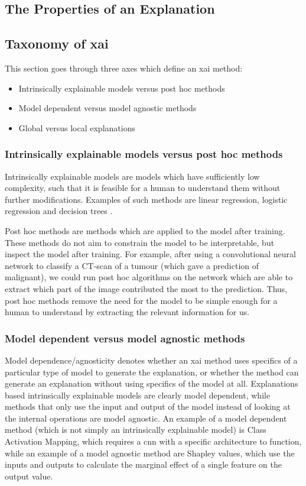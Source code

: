 \documentclass[UKenglish]{uiomasterthesis} %
\theoremstyle{definition}
\begin{document}
\subsection{The Properties of an Explanation}

\subsection{Taxonomy of \ac{xai}}

This section goes through three axes which define an \ac{xai} method:

\begin{itemize}
  \item Intrinsically explainable models versus post hoc methods
  \item Model dependent versus model agnostic methods
  \item Global versus local explanations
\end{itemize}


\subsubsection{Intrinsically explainable models versus post hoc methods}

Intrinsically explainable models are models which have sufficiently low complexity, such that it is feasible for a human to understand them without further modifications. Examples of such methods are linear regression, logistic regression and decision trees \cite{molnar}. 

Post hoc methods are methods which are applied to the model after training. These methods do not aim to constrain the model to be interpretable, but inspect the model after training. For example, after using a convolutional neural network to classify a CT-scan of a tumour (which gave a prediction of malignant), we could run post hoc algorithms on the network which are able to extract which part of the image contributed the most to the prediction. Thus, post hoc methods remove the need for the model to be simple enough for a human to understand by extracting the relevant information for us.

\subsubsection{Model dependent versus model agnostic methods}

Model dependence/agnosticity denotes whether an \ac{xai} method uses specifics of a particular type of model to generate the explanation, or whether the method can generate an explanation without using specifics of the model at all. Explanations based intrinsically explainable models are clearly model dependent, while methods that only use the input and output of the model instead of looking at the internal operations are model agnostic. An example of a model dependent method (which is not simply an intrinsically explainable model) is Class Activation Mapping, which requires a \ac{cnn} with a specific architecture to function, while an example of a model agnostic method are Shapley values, which use the inputs and outputs to calculate the marginal effect of a single feature on the output value.
\end{document}
